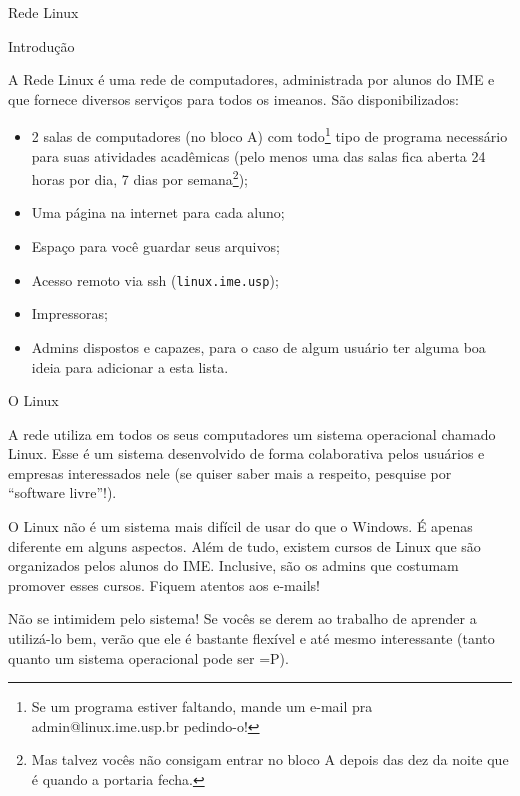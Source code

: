 \begin{subsecao}{Rede Linux}


\begin{subsubsecao}{Introdução}

A Rede Linux é uma rede de computadores, administrada por alunos do IME e
que fornece diversos serviços para todos os imeanos.
São disponibilizados:

\vspace{-1em}

\begin{itemize}
\item 2 salas de computadores (no bloco A) com todo\footnote{ Se um programa
estiver faltando, mande um e-mail pra admin@linux.ime.usp.br pedindo-o!} tipo de
programa necessário para suas atividades acadêmicas (pelo menos uma das salas fica
aberta 24 horas por dia, 7 dias por semana\footnote{ Mas talvez vocês não
consigam entrar no bloco A depois das dez da noite que é quando a portaria
fecha.});
\item Uma página na internet para cada aluno;
\item Espaço para você guardar seus arquivos;
\item Acesso remoto via ssh (\texttt{linux.ime.usp});
\item Impressoras;
\item Admins dispostos e capazes, para o caso de algum usuário ter alguma boa
ideia para adicionar a esta lista.
\end{itemize}
\end{subsubsecao}

\begin{subsubsecao}{O Linux}

A rede utiliza em todos os seus computadores um sistema operacional chamado
Linux. Esse é um sistema desenvolvido de forma colaborativa pelos usuários
e empresas interessados nele (se quiser saber mais a respeito, pesquise
por ``software livre''!).

O Linux não é um sistema mais difícil de usar do que o Windows. É apenas
diferente em alguns aspectos. Além de tudo, existem cursos de Linux que são
organizados pelos alunos do IME. Inclusive, são os admins que costumam promover 
esses cursos. Fiquem atentos aos e-mails!

Não se intimidem pelo sistema! Se vocês se derem ao trabalho de
aprender a utilizá-lo bem, verão que ele é bastante flexível e até mesmo
interessante (tanto quanto um sistema operacional pode ser =P).


\end{subsubsecao}
\end{subsecao}
